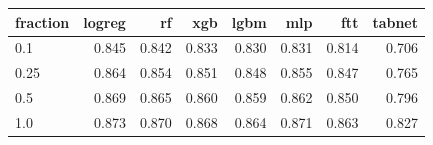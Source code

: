 \begin{tabular}{lrrrrrrr}
\toprule
fraction & logreg & rf & xgb & lgbm & mlp & ftt & tabnet \\
\midrule
0.1 & 0.845 & 0.842 & 0.833 & 0.830 & 0.831 & 0.814 & 0.706 \\
0.25 & 0.864 & 0.854 & 0.851 & 0.848 & 0.855 & 0.847 & 0.765 \\
0.5 & 0.869 & 0.865 & 0.860 & 0.859 & 0.862 & 0.850 & 0.796 \\
1.0 & 0.873 & 0.870 & 0.868 & 0.864 & 0.871 & 0.863 & 0.827 \\
\bottomrule
\end{tabular}
